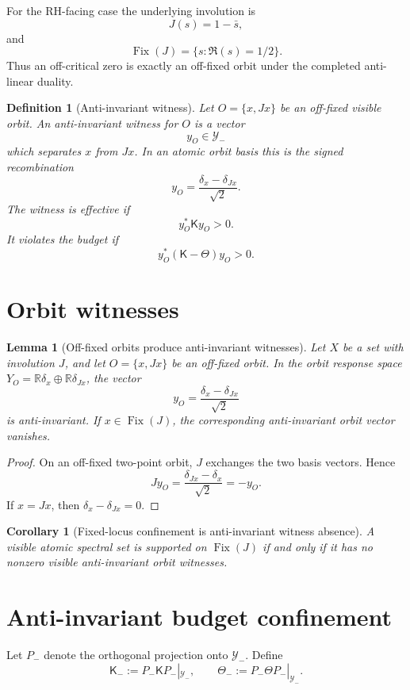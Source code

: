 \documentclass[11pt]{article}
\newtheorem{lemma}[theorem]{Lemma}
\newtheorem{corollary}[theorem]{Corollary}
\newtheorem{definition}[theorem]{Definition}
\newcommand{\Kmat}{\mathsf K}
\newcommand{\ThetaB}{\mathsf\Theta}
\newcommand{\Fix}{\operatorname{Fix}}
\begin{document}
For the RH-facing case the underlying involution is
\[
J(s)=1-\bar s,
\]
and
\[
\Fix(J)=\{s:\Re(s)=1/2\}.
\]
Thus an off-critical zero is exactly an off-fixed orbit under the completed anti-linear duality.

\begin{definition}[Anti-invariant witness]
Let $O=\{x,Jx\}$ be an off-fixed visible orbit.  An anti-invariant witness for $O$ is a vector
\[
y_O\in\mathcal Y_-
\]
which separates $x$ from $Jx$.  In an atomic orbit basis this is the signed recombination
\[
y_O=\frac{\delta_x-\delta_{Jx}}{\sqrt2}.
\]
The witness is effective if
\[
y_O^*\Kmat y_O>0.
\]
It violates the budget if
\[
y_O^*(\Kmat-\ThetaB)y_O>0.
\]
\end{definition}

\section{Orbit witnesses}

\begin{lemma}[Off-fixed orbits produce anti-invariant witnesses]
Let $X$ be a set with involution $J$, and let $O=\{x,Jx\}$ be an off-fixed orbit.  In the orbit response space $Y_O=\mathbb R\delta_x\oplus\mathbb R\delta_{Jx}$, the vector
\[
y_O=\frac{\delta_x-\delta_{Jx}}{\sqrt2}
\]
is anti-invariant.  If $x\in\Fix(J)$, the corresponding anti-invariant orbit vector vanishes.
\end{lemma}

\begin{proof}
On an off-fixed two-point orbit, $J$ exchanges the two basis vectors.  Hence
\[
J y_O=\frac{\delta_{Jx}-\delta_x}{\sqrt2}=-y_O.
\]
If $x=Jx$, then $\delta_x-\delta_{Jx}=0$.
\end{proof}

\begin{corollary}[Fixed-locus confinement is anti-invariant witness absence]
A visible atomic spectral set is supported on $\Fix(J)$ if and only if it has no nonzero visible anti-invariant orbit witnesses.
\end{corollary}

\section{Anti-invariant budget confinement}

Let $P_-$ denote the orthogonal projection onto $\mathcal Y_-$.  Define
\[
\Kmat_-:=P_-\Kmat P_-|_{\mathcal Y_-},
\qquad
\Theta_-:=P_-\ThetaB P_-|_{\mathcal Y_-}.
\]
\end{document}

